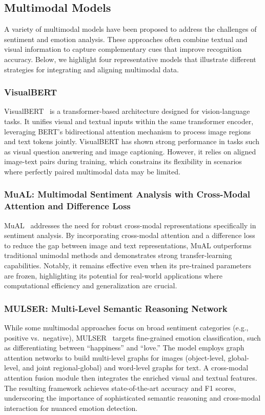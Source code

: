 \subsection{Multimodal Models}

A variety of multimodal models have been proposed to address the challenges of sentiment and emotion analysis. These approaches often combine textual and visual information to capture complementary cues that improve recognition accuracy. Below, we highlight four representative models that illustrate different strategies for integrating and aligning multimodal data.

\subsubsection{VisualBERT}
VisualBERT~\cite{li2019visualbertsimpleperformantbaseline} is a transformer-based architecture designed for vision-language tasks. It unifies visual and textual inputs within the same transformer encoder, leveraging BERT's bidirectional attention mechanism to process image regions and text tokens jointly. VisualBERT has shown strong performance in tasks such as visual question answering and image captioning. However, it relies on aligned image-text pairs during training, which constrains its flexibility in scenarios where perfectly paired multimodal data may be limited.

\subsubsection{MuAL: Multimodal Sentiment Analysis with Cross-Modal Attention and Difference Loss}
MuAL~\cite{deng_mual_2024} addresses the need for robust cross-modal representations specifically in sentiment analysis. By incorporating cross-modal attention and a difference loss to reduce the gap between image and text representations, MuAL outperforms traditional unimodal methods and demonstrates strong transfer-learning capabilities. Notably, it remains effective even when its pre-trained parameters are frozen, highlighting its potential for real-world applications where computational efficiency and generalization are crucial.

\subsubsection{MULSER: Multi-Level Semantic Reasoning Network}
While some multimodal approaches focus on broad sentiment categories (e.g., positive vs.\ negative), MULSER~\cite{9920172} targets fine-grained emotion classification, such as differentiating between ``happiness'' and ``love.'' The model employs graph attention networks to build multi-level graphs for images (object-level, global-level, and joint regional-global) and word-level graphs for text. A cross-modal attention fusion module then integrates the enriched visual and textual features. The resulting framework achieves state-of-the-art accuracy and F1 scores, underscoring the importance of sophisticated semantic reasoning and cross-modal interaction for nuanced emotion detection.

